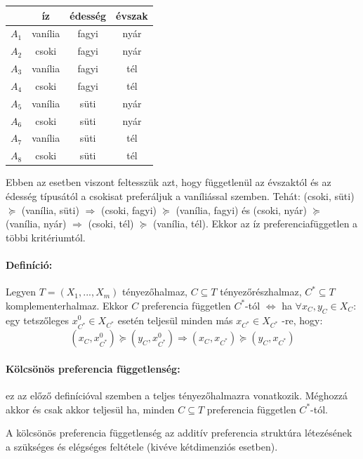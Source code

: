 \documentclass[a4paper,12pt]{article}
\begin{document}
\begin{center}
\begin{tabular}{c||c|c|c}
 & íz& édesség& évszak \\
 \hline
 $A_1$& vanília  & fagyi & nyár \\
 $A_2$& csoki  & fagyi & nyár \\
 $A_3$& vanília  & fagyi & tél \\
 $A_4$& csoki  & fagyi & tél \\
 $A_5$& vanília  & süti & nyár \\
 $A_6$& csoki  & süti & nyár \\
 $A_7$& vanília  & süti & tél \\
 $A_8$& csoki  & süti & tél \\
\end{tabular}
\end{center}

Ebben az esetben viszont feltesszük azt, hogy függetlenül az évszaktól és az édesség típusától a csokisat preferáljuk a vaníliással szemben.
Tehát: (csoki, süti) $\succeq$ (vanília, süti) $\Rightarrow$ (csoki, fagyi) $\succeq$ (vanília, fagyi) és (csoki, nyár) $\succeq$ (vanília, nyár) $\Rightarrow$ (csoki, tél) $\succeq$ (vanília, tél). Ekkor az íz preferenciafüggetlen a többi kritériumtól.


\paragraph{Definíció: } Legyen $T=(X_1,...,X_m)$ tényezőhalmaz, $C \subseteq T$ tényezőrészhalmaz,  $C^* \subseteq T $ komplementerhalmaz. Ekkor $C$ preferencia független $C^*$-tól $\Leftrightarrow$ ha $\forall x_C, y_C \in X_C:$  egy tetszőleges $x_{C^{*}}^0 \in X_{C^*}$  esetén teljesül minden más $ x_{C^{*}} \in X_{C^*}$ -re, hogy:
\begin{equation}
(x_C, x_{C^{*}}^0) \succeq (y_C, x_{C^{*}}^0) 
\Rightarrow
(x_C, x_{C^{*}}) \succeq (y_C, x_{C^{*}}) 
\end{equation}

\paragraph{Kölcsönös preferencia függetlenség: } ez az előző definícióval szemben a teljes tényezőhalmazra vonatkozik. Méghozzá akkor és csak akkor teljesül ha, minden $C \subseteq T$ preferencia független $C^*$-tól.

A kölcsönös preferencia függetlenség az additív preferencia struktúra létezésének a szükséges és elégséges feltétele (kivéve kétdimenziós esetben).
\end{document}
